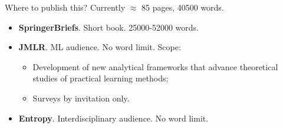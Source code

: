 \documentclass{beamer}
\begin{document}
\begin{frame}{Where to publish this?}
Currently $\approx$ 85 pages, 40500 words.
\begin{itemize}
    \item \textbf{SpringerBriefs}. Short book. 25000-52000 words.
    \item \textbf{JMLR}. ML audience. No word limit. Scope:
    \begin{itemize}
        \item Development of new analytical frameworks that advance theoretical studies of practical learning methods;
        \item Surveys by invitation only.
    \end{itemize}
    \item \textbf{Entropy}. Interdisciplinary audience. No word limit.
\end{itemize}
\end{frame}
\end{document}

